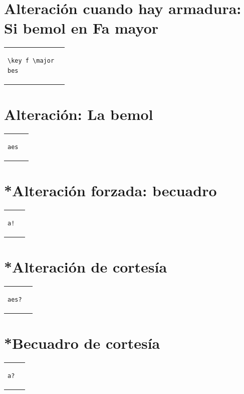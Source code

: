 \documentclass[a4paper,10pt,oneside,headinclude,titlepage]{article} %
\begin{document}
\section*{Alteración cuando hay armadura: Si bemol en Fa mayor}
\begin{tabular}{m{2cm}m{2cm}}
\begin{verbatim}
\key f \major
bes
\end{verbatim}
&
\begin[fragment,relative=2,notime]{lilypond}
    \key f \major
    bes
\end{lilypond}
\end{tabular}

\section*{Alteración: La bemol}
\begin{tabular}{m{2cm}m{2cm}}
\begin{verbatim}
aes
\end{verbatim}
&
\begin[fragment,relative=2,notime]{lilypond}
aes
\end{lilypond}
\end{tabular}

\section*{*Alteración forzada: becuadro}
\begin{tabular}{m{2cm}m{2cm}}
\begin{verbatim}
a!
\end{verbatim}
&
\begin[fragment,relative=2,notime]{lilypond}
a!
\end{lilypond}
\end{tabular}

\section*{*Alteración de cortesía}
\begin{tabular}{m{2cm}m{2cm}}
\begin{verbatim}
aes?
\end{verbatim}
&
\begin[fragment,relative=2,notime]{lilypond}
aes?
\end{lilypond}
\end{tabular}

\section*{*Becuadro de cortesía}
\begin{tabular}{m{2cm}m{2cm}}
\begin{verbatim}
a?
\end{verbatim}
&
\begin[fragment,relative=2,notime]{lilypond}
a?
\end{lilypond}
\end{tabular}
\end{document}
